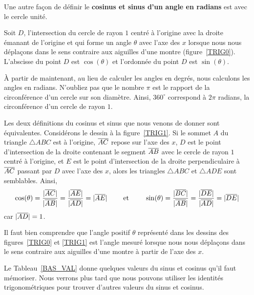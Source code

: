 {

Une autre façon de définir le
{\bfseries cosinus et sinus d'un angle en radians} est avec le cercle
unité.

\begin{defn}
Soit $D$, l'intersection du cercle de rayon $1$ centré à l'origine
avec la droite émanant de l'origine et qui forme un angle $\theta$
avec l'axe des $x$ lorsque nous nous déplaçons dans le sens contraire aux
aiguilles d'une montre (figure~\ref{TRIG0}).  L'abscisse du
point $D$ est $\cos(\theta)$ et l'ordonnée du point $D$
est $\sin(\theta)$.
\end{defn}


À partir de maintenant, au lieu de calculer les angles en degrés, nous
calculons les angles en radians.  N'oubliez pas que le nombre $\pi$
est le rapport de la circonférence d'un cercle sur son diamètre.
Ainsi,  $360^\circ$ correspond à $2\pi$ radians, la circonférence d'un
cercle de rayon $1$.

Les deux définitions du cosinus et sinus que nous venons de donner
sont équivalentes.  Considérons le dessin à la figure~\ref{TRIG1}.
Si le sommet $A$ du triangle $\triangle ABC$ est à l'origine,
$\overline{AC}$ repose sur l'axe des $x$, $D$ est le point d'intersection
de la droite contenant le segment $\overline{AB}$ avec le cercle de rayon
$1$ centré à l'origine, et $E$ est le point d'intersection de la
droite perpendiculaire à $\overline{AC}$ passant par $D$ avec l'axe des
$x$, alors les triangles $\triangle ABC$ et $\triangle ADE$ sont
semblables.  Ainsi,
\[
\cos(\theta) = \frac{|\overline{AC}|}{|\overline{AB}|} = \frac{|\overline{AE}|}{|\overline{AD}|} =
|\overline{AE}|
\qquad \text{ et } \qquad
\sin(\theta) = \frac{|\overline{BC}|}{|\overline{AB}|} = \frac{|\overline{DE}|}{|\overline{AD}|} =
|\overline{DE}|
\]
car $|\overline{AD}|=1$.

Il faut bien comprendre que l'angle positif $\theta$ représenté dans les
dessins des figures~\ref{TRIG0} et \ref{TRIG1} est l'angle mesuré lorsque nous
nous déplaçons dans le sens contraire aux aiguilles d'une montre à
partir de l'axe des $x$.

Le Tableau~\ref{BAS_VAL} donne quelques valeurs du sinus et cosinus
qu'il faut mémoriser.  Nous verrons plus tard que nous pouvons
utiliser les identités trigonométriques pour trouver d'autres valeurs
du sinus et cosinus.

}
